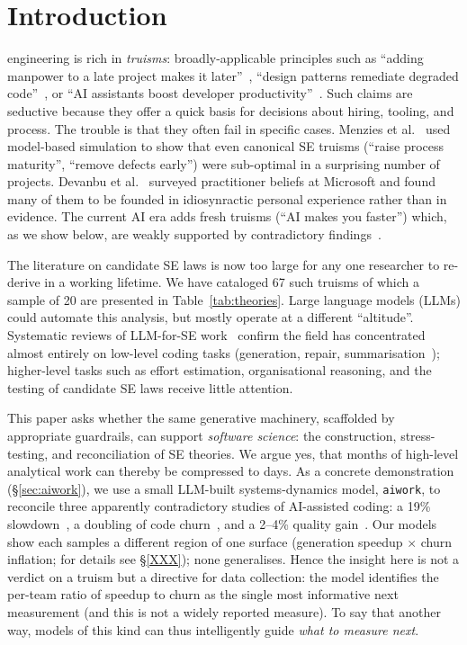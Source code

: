 \documentclass[10pt,conference]{IEEEtran}
\begin{document}
\section{Introduction}
 engineering is rich in \emph{truisms}:
broadly-applicable principles such as ``adding manpower to a late
project makes it later''~\cite{brooks1975mmm}, ``design patterns
remediate degraded code''~\cite{gamma1994patterns}, or
``AI assistants boost developer
productivity''~\cite{github2024copilot}. Such claims are seductive
because they offer a quick basis for decisions about hiring,
tooling, and process.
The trouble is that they often fail in specific cases. 
 Menzies et al.~\cite{menzies2002truisms} used
model-based simulation to show that even canonical SE truisms
(``raise process maturity'', ``remove defects early'') were
sub-optimal in a surprising number of projects.
Devanbu et al.~\cite{devanbu2016belief} surveyed
practitioner beliefs at Microsoft and found many of them
to be founded in idiosynractic 
personal experience rather than in evidence. The current AI era
adds fresh truisms (``AI makes you faster'') which, as we show below,
are weakly supported by contradictory findings~\cite{becker2025metr}. 

The literature
on candidate SE laws is now too large for any one researcher to
re-derive in a working lifetime. We have cataloged
67 such truisms of which a sample of 20
are presented in Table~\ref{tab:theories}.
Large language models (LLMs) could automate this analysis, but
mostly operate at a different ``altitude''. Systematic reviews of
LLM-for-SE work~\cite{hou2024llm4se,fan2023llm4se} confirm the
field has concentrated almost entirely on low-level coding tasks
(generation, repair, summarisation~\cite{chen2021codex}); higher-level
tasks such as effort estimation, organisational reasoning, and the
testing of candidate SE laws receive little attention. 

This paper asks
whether the same generative machinery, scaffolded by appropriate
guardrails, can support \emph{software science}: the construction,
stress-testing, and reconciliation of SE theories. We argue
yes, that months of high-level analytical work can thereby
be compressed to days.
As a concrete demonstration (\S\ref{sec:aiwork}), we use a small
LLM-built systems-dynamics model, \texttt{aiwork}, to reconcile
three apparently contradictory studies of AI-assisted coding: a
19\% slowdown~\cite{becker2025metr}, a doubling of code
churn~\cite{gitclear2024churn}, and a 2--4\% quality
gain~\cite{github2024copilot}. 
Our models show each samples a different region of one surface
(generation speedup $\times$ churn inflation; for details see \S\ref{XXX});  %
none generalises.
Hence the insight here  is not a verdict on a truism but a directive
for data collection: the model identifies the per-team ratio of
speedup to churn as the single most informative next
measurement (and this is not a widely reported measure).
To say that another way,
models of this
kind can thus intelligently guide \emph{what to measure next}.
\end{document}
